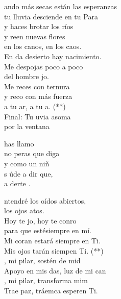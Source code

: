 \documentclass[12pt]{article}
\begin{document}
\begin{multicols*}{2}
\begin{cancion}%
	ando más secas están las esperanzas\\
	tu lluvia desciende en tu Para\\
	y haces brotar los ríos\\
	y reen nuevas flores\\
	en los canos, en los caos.\\
	En da desierto hay nacimiento.\\
Me despojas poco a poco \\
	del hombre jo.\\
	Me reces con ternura\\
	y reco con más fuerza\\
	a tu ar, a tu a. (**)\\
\jump
	Final: Tu uvia asoma\\
       por la ventana\\
\end{cancion}%

\begin{cancion}%
	  has llamo\\
	no peras que diga\\
	y como un niñ\\
	s úde a dir que, \\
	a derte .\\
\end{cancion}%

\begin{cancion}%
	ntendré los oídos abiertos,\\
	los ojos atos.\\
	Hoy te jo, hoy te conro\\
	para que estésiempre en mí.\\
	Mi coran estará siempre en Ti.\\
	Mis ojos tarán siempen Ti. (**)\\
\jump
	, mi pilar, sostén de mid\\
	Apoyo en mis das, luz de mi can\\
	, mi pilar, transforma mim\\
	Trae paz, tráemca esperen Ti.\\
\end{cancion}%


\end{multicols*}
\end{document}
